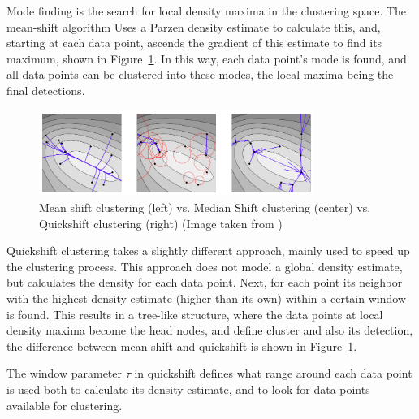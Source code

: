 Mode finding is the search for local density maxima in the clustering space. The mean-shift algorithm \cite{cheng1995mean} Uses a Parzen density estimate to calculate this, and, starting at each data point, ascends the gradient of this estimate to find its maximum, shown in Figure~\ref{fig:ms_qs}. In this way, each data point's mode is found, and all data points can be clustered into these modes, the local maxima being the final detections.

\begin{figure}[hbt]
    \centering
    \includegraphics[width=0.8\textwidth]{MeanshiftMedianshiftQuickshift}
    \caption{Mean shift clustering (left) vs. Median Shift clustering (center) vs. Quickshift clustering (right) (Image taken from \cite{vedaldi2008quick})}
    \label{fig:ms_qs}
\end{figure}

Quickshift clustering takes a slightly different approach, mainly used to speed up the clustering process. \cite{vedaldiquick} This approach does not model a global density estimate, but calculates the density for each data point. Next, for each point its neighbor with the highest density estimate (higher than its own) within a certain window is found. This results in a tree-like structure, where the data points at local density maxima become the head nodes, and define cluster and also its detection, the difference between mean-shift and quickshift is shown in Figure~\ref{fig:ms_qs}.

The window parameter $\tau$ in quickshift defines what range around each data point is used both to calculate its density estimate, and to look for data points available for clustering.



